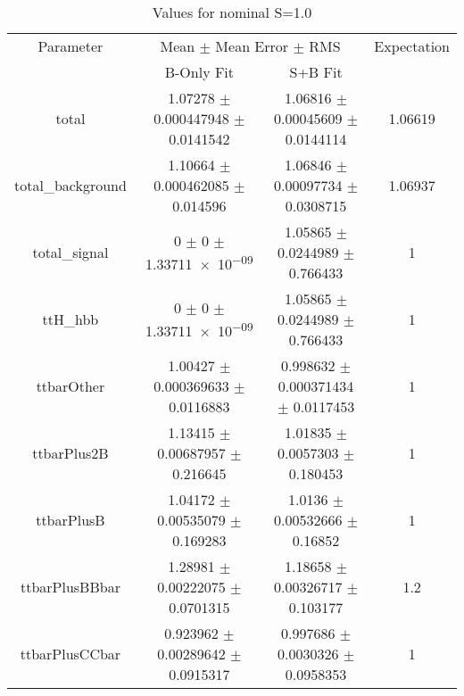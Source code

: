 \begin{table}
\centering
\caption{Values for nominal S=1.0}
\begin{tabular}{cccc}
\toprule
Parameter & \multicolumn{2}{c}{Mean $\pm$ Mean Error $\pm$ RMS} & Expectation\\
 & B-Only Fit & S+B Fit & \\
\midrule
total & \num{1.07278} $\pm$ \num{0.000447948} $\pm$ \num{0.0141542} & \num{1.06816} $\pm$ \num{0.00045609} $\pm$ \num{0.0144114} & \num{1.06619}\\
total\_background & \num{1.10664} $\pm$ \num{0.000462085} $\pm$ \num{0.014596} & \num{1.06846} $\pm$ \num{0.00097734} $\pm$ \num{0.0308715} & \num{1.06937}\\
total\_signal & \num{0} $\pm$ \num{0} $\pm$ \num{1.33711e-09} & \num{1.05865} $\pm$ \num{0.0244989} $\pm$ \num{0.766433} & \num{1}\\
ttH\_hbb & \num{0} $\pm$ \num{0} $\pm$ \num{1.33711e-09} & \num{1.05865} $\pm$ \num{0.0244989} $\pm$ \num{0.766433} & \num{1}\\
ttbarOther & \num{1.00427} $\pm$ \num{0.000369633} $\pm$ \num{0.0116883} & \num{0.998632} $\pm$ \num{0.000371434} $\pm$ \num{0.0117453} & \num{1}\\
ttbarPlus2B & \num{1.13415} $\pm$ \num{0.00687957} $\pm$ \num{0.216645} & \num{1.01835} $\pm$ \num{0.0057303} $\pm$ \num{0.180453} & \num{1}\\
ttbarPlusB & \num{1.04172} $\pm$ \num{0.00535079} $\pm$ \num{0.169283} & \num{1.0136} $\pm$ \num{0.00532666} $\pm$ \num{0.16852} & \num{1}\\
ttbarPlusBBbar & \num{1.28981} $\pm$ \num{0.00222075} $\pm$ \num{0.0701315} & \num{1.18658} $\pm$ \num{0.00326717} $\pm$ \num{0.103177} & \num{1.2}\\
ttbarPlusCCbar & \num{0.923962} $\pm$ \num{0.00289642} $\pm$ \num{0.0915317} & \num{0.997686} $\pm$ \num{0.0030326} $\pm$ \num{0.0958353} & \num{1}\\
\bottomrule
\end{tabular}
\end{table}